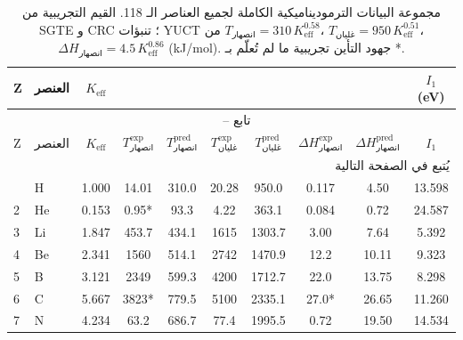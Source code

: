 \documentclass[11pt,a4paper]{article}
\begin{document}
	\begin{english}
		\setlength{\tabcolsep}{3pt}
		\begin{longtable}{@{}llcccccccc@{}}
			\caption{مجموعة البيانات الترموديناميكية الكاملة لجميع العناصر الـ 118. 
				القيم التجريبية من SGTE \cite{Dinsdale1991} و CRC \cite{CRC}؛ 
				تنبؤات YUCT من \(T_{\text{انصهار}} = 310\,K_{\mathrm{eff}}^{0.58}\)، 
				\(T_{\text{غليان}} = 950\,K_{\mathrm{eff}}^{0.51}\)، 
				\(\Delta H_{\text{انصهار}} = 4.5\,K_{\mathrm{eff}}^{0.86}\) (kJ/mol). 
				جهود التأين تجريبية ما لم تُعلّم بـ *.}
			\label{tab:full_118}\\
			\toprule
			Z & العنصر & \(K_{\mathrm{eff}}\) & 
			\makebox[1.5cm]{\(T_{\text{انصهار}}^{\text{exp}}\) (K)} & 
			\makebox[1.5cm]{\(T_{\text{انصهار}}^{\text{pred}}\) (K)} &
			\makebox[1.5cm]{\(T_{\text{غليان}}^{\text{exp}}\) (K)} & 
			\makebox[1.5cm]{\(T_{\text{غليان}}^{\text{pred}}\) (K)} &
			\makebox[1.5cm]{\(\Delta H_{\text{انصهار}}^{\text{exp}}\) (kJ/mol)} & 
			\makebox[1.5cm]{\(\Delta H_{\text{انصهار}}^{\text{pred}}\) (kJ/mol)} &
			\(I_1\) (eV) \\
			\midrule
			\endfirsthead
			\multicolumn{10}{c}{\tablename\ \thetable{} -- تابع} \\
			\toprule
			Z & العنصر & \(K_{\mathrm{eff}}\) & \(T_{\text{انصهار}}^{\text{exp}}\) & \(T_{\text{انصهار}}^{\text{pred}}\) &
			\(T_{\text{غليان}}^{\text{exp}}\) & \(T_{\text{غليان}}^{\text{pred}}\) & \(\Delta H_{\text{انصهار}}^{\text{exp}}\) & \(\Delta H_{\text{انصهار}}^{\text{pred}}\) & \(I_1\) \\
			\midrule
			\endhead
			\bottomrule
			\multicolumn{10}{r}{يُتبع في الصفحة التالية} \\
			\endfoot
			\endlastfoot
			1  & H   & 1.000 & 14.01  & 310.0  & 20.28  & 950.0  & 0.117 & 4.50  & 13.598 \\
			2  & He  & 0.153 & 0.95*  & 93.3   & 4.22   & 363.1  & 0.084 & 0.72  & 24.587 \\
			3  & Li  & 1.847 & 453.7  & 434.1  & 1615   & 1303.7 & 3.00  & 7.64  & 5.392 \\
			4  & Be  & 2.341 & 1560   & 514.1  & 2742   & 1470.9 & 12.2  & 10.11 & 9.323 \\
			5  & B   & 3.121 & 2349   & 599.3  & 4200   & 1712.7 & 22.0  & 13.75 & 8.298 \\
			6  & C   & 5.667 & 3823*  & 779.5  & 5100   & 2335.1 & 27.0* & 26.65 & 11.260 \\
			7  & N   & 4.234 & 63.2   & 686.7  & 77.4   & 1995.5 & 0.72  & 19.50 & 14.534 \\

\end{longtable}
\end{english}
\end{document}
